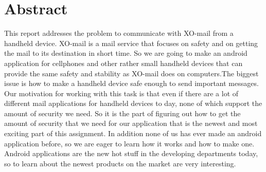 
\chapter*{Abstract}

This report addresses the problem to communicate with XO-mail from a handheld device. XO-mail is a mail service that focuses on safety and on getting the mail to its destination in short time. So we are going to make an android application for cellphones and other rather small handheld devices that can provide the same safety and stability as XO-mail does on computers.The biggest issue is how to make a handheld device safe enough to send important messages.
\newline
\newline
Our motivation for working with this task is that even if there are a lot of different mail applications for handheld devices to day, none of which support the amount of security we need. So it is the part of figuring out how to get the amount of security that we need for our application that is the newest and most exciting part of this assignment. In addition none of us has ever made an android application before, so we are eager to learn how it works and how to make one. Android applications are the new hot stuff in the developing departments today, so to learn about the newest products on the market are very interesting.

